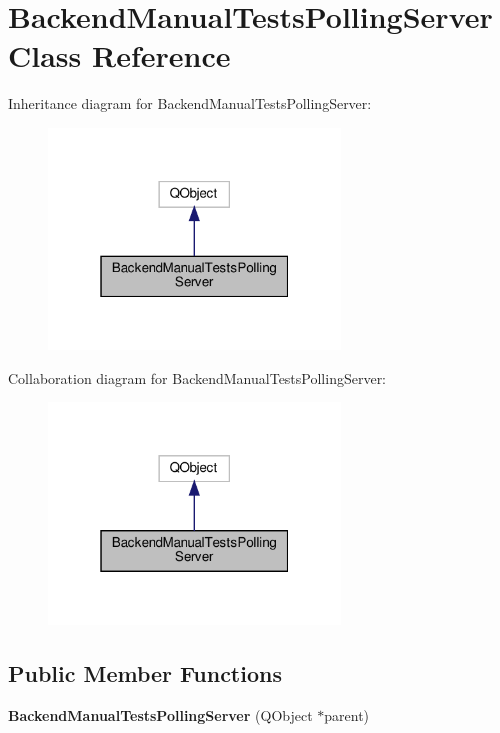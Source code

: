 \hypertarget{classBackendManualTestsPollingServer}{}\section{Backend\+Manual\+Tests\+Polling\+Server Class Reference}
\label{classBackendManualTestsPollingServer}


Inheritance diagram for Backend\+Manual\+Tests\+Polling\+Server\+:\nopagebreak
\begin{figure}[H]
\begin{center}
\leavevmode
\includegraphics[width=220pt]{classBackendManualTestsPollingServer__inherit__graph}
\end{center}
\end{figure}


Collaboration diagram for Backend\+Manual\+Tests\+Polling\+Server\+:\nopagebreak
\begin{figure}[H]
\begin{center}
\leavevmode
\includegraphics[width=220pt]{classBackendManualTestsPollingServer__coll__graph}
\end{center}
\end{figure}
\subsection*{Public Member Functions}
\begin{DoxyCompactItemize}
\item 
\mbox{\label{classBackendManualTestsPollingServer_aa1b870718edee843e64807451ff41dea}} 
{\bfseries Backend\+Manual\+Tests\+Polling\+Server} (Q\+Object $\ast$parent)
\end{DoxyCompactItemize}
